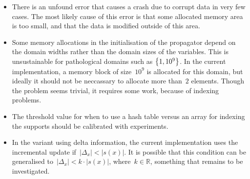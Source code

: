 \documentclass[a4paper,11pt]{article}
\newcommand{\Chapref}[1]{Section~\ref{#1}}
\numberwithin{equation}{section}
\begin{document}
\begin{itemize}
  \item There is an unfound error that causes a crash due to corrupt data 
    in very few cases.
    The most likely cause of this error is that some allocated memory area
    is too small, and that the data is modified outside of this area.
    
  \item Some memory allocations in the initialisation of the propagator
    depend on the domain widths rather
    than the domain sizes of the variables. This is unsustainable
    for pathological domains such as $\left\{1, 10^9\right\}$. In the current
    implementation, a memory block of size~$10^9$ is allocated for this
    domain, but ideally it should not be neccassary to allocate more than~$2$
    elements. Though the problem seems trivial, it requires some
    work, because of indexing problems.

  \item The threshold value for when to use a hash table versus
    an array for indexing the supports should be calibrated with
    experiments.

  \item In the variant using delta information, the current implementation
    uses the incremental update if~$|\Delta_x| < |s(x)|$. It is possible
    that this condition can be generalised to~$|\Delta_x| < k \cdot |s(x)|$,
    where~$k \in \mathbb{R}$, something that remains to be investigated.

\end{itemize}






\end{document}
